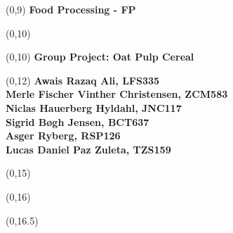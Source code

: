 \begin{titlepage}

    
    \begin{textblock}{9.4}(0,9)
        \Huge{\selectfont\bfseries{Food Processing - FP}}
    \end{textblock}
    \begin{textblock}{9.4}(0,10)
        \Huge{\selectfont\bfseries{}}
    \end{textblock}
    
    \begin{textblock}{9.4}(0,10)
        \LARGE{\selectfont\bfseries{Group Project: Oat Pulp Cereal}}
    \end{textblock}
    
    \begin{textblock}{9.4}(0,12)
        \large{\selectfont\bfseries{Awais Razaq Ali, LFS335
        \\  Merle Fischer Vinther Christensen, ZCM583
        \\  Niclas Hauerberg Hyldahl, JNC117
        \\  Sigrid Bøgh Jensen, BCT637
        \\  Asger Ryberg, RSP126
        \\  Lucas Daniel Paz Zuleta, TZS159}}
    \end{textblock}
    
    \begin{textblock}{9.4}(0,15)
        \large{\selectfont{MSc students at University of Copenhagen}}
    \end{textblock}
    
    \begin{textblock}{9.4}(0,16)
        \large{\selectfont{Last compiled: \today}}
    \end{textblock}
    
    \begin{textblock}{8.4}(0,16.5)
        \large{}
    \end{textblock}
    

\end{titlepage}
